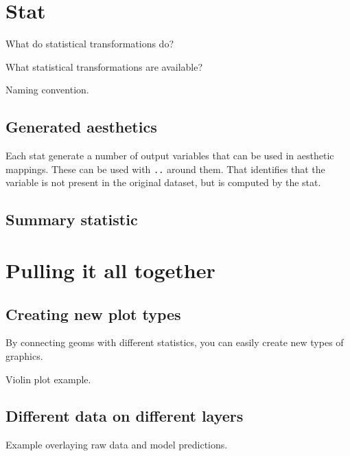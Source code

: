 \section{Stat}
\label{sec:stat}

What do statistical transformations do?

What statistical transformations are available?

Naming convention.



\subsection{Generated aesthetics}
\label{sub:generated_aesthetics}

Each stat generate a number of output variables that can be used in aesthetic mappings.  These can be used with {\tt ..} around them.  That identifies that the variable is not present in the original dataset, but is computed by the stat.

\subsection{Summary statistic}
\label{sub:summary_statistic}

\section{Pulling it all together}
\label{sec:pulling_it_all_together}

\subsection{Creating new plot types}
\label{sub:new_plot_types}

By connecting geoms with different statistics, you can easily create new types of graphics.  

Violin plot example.

\subsection{Different data on different layers}
\label{sub:different_data_on_different_layers}

Example overlaying raw data and model predictions.



